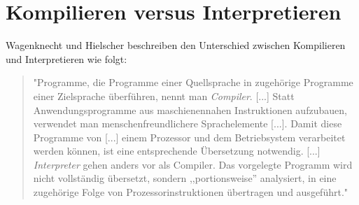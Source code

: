 \section{Kompilieren versus Interpretieren}
\label{sec:basics:compile-interpret}

Wagenknecht und Hielscher beschreiben den Unterschied zwischen Kompilieren und Interpretieren wie folgt:

\begin{quote}
    "Programme, die Programme einer Quellsprache in zugehörige Programme einer Zielsprache überführen, nennt man \emph{Compiler}. [...] Statt Anwendungsprogramme aus maschienennahen Instruktionen aufzubauen, verwendet man menschenfreundlichere Sprachelemente [...]. Damit diese Programme von [...] einem Prozessor und dem Betriebsystem verarbeitet werden können, ist eine entsprechende Übersetzung notwendig. [...] \emph{Interpreter} gehen anders vor als Compiler. Das vorgelegte Programm wird nicht vollständig übersetzt, sondern ,,portionsweise'' analysiert, in eine zugehörige Folge von Prozessorinstruktionen übertragen und ausgeführt."~\cite[47]{wagenknecht2009}
\end{quote}
